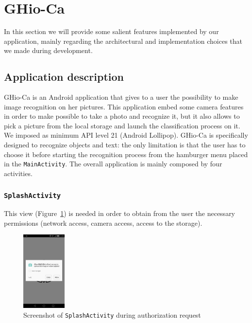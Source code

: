 \section{GHio-Ca}
\label{sec:ghioca}
In this section we will provide some salient features implemented by our
application, mainly regarding the architectural and implementation choices that
we made during development.

\subsection{Application description}
GHio-Ca is an Android application that gives to a user the possibility to make
image recognition on her pictures. This application embed some camera features
in order to make possible to take a photo and recognize it, but it also allows
to pick a picture from the local storage and launch the classification process
on it. We imposed as minimum API level 21 (Android Lollipop).
GHio-Ca is specifically designed to recognize objects and text: the only
limitation is that the user has to choose it before starting the recognition
process from the hamburger menu placed in the \texttt{MainActivity}.
The overall application is mainly composed by four activities.

\subsubsection{\texttt{SplashActivity}}
This view (Figure~\ref{fig:splash}) is needed in order to obtain from the user
the necessary permissions (network access, camera access, access to  the
storage).
\begin{figure}[h]
    \centering
    \includegraphics[width=0.2\textwidth]{../img/splash}
    \caption{Screenshot of \texttt{SplashActivity} during authorization request}
    \label{fig:splash}
\end{figure}

